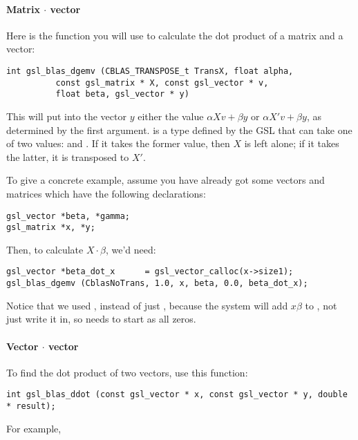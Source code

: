 \paragraph{Matrix $\cdot$ vector} Here is the function you will use to calculate the dot product of a
matrix and a vector:
\begin{lstlisting}
int gsl_blas_dgemv (CBLAS_TRANSPOSE_t TransX, float alpha, 
          const gsl_matrix * X, const gsl_vector * v, 
          float beta, gsl_vector * y)
\end{lstlisting}

This will put into the vector $y$ either the value 
$\alpha X v + \beta y$ or $\alpha X' v + \beta y$, as determined by the
first argument.
 is a type defined by the GSL that can take
one of two values:  and . If
it takes the former value, then $X$ is left alone;
if it takes the latter, it is transposed to $X'$.

To give a concrete example, assume you have already got some vectors and matrices which have the following
declarations:
\begin{lstlisting}
gsl_vector *beta, *gamma;     
gsl_matrix *x, *y;           
\end{lstlisting}

Then, to calculate $X\cdot \beta$, we'd need:

\begin{lstlisting}
gsl_vector *beta_dot_x      = gsl_vector_calloc(x->size1);
gsl_blas_dgemv (CblasNoTrans, 1.0, x, beta, 0.0, beta_dot_x);
\end{lstlisting}

Notice that we used , instead of just , because
the system will add $x\beta$ to , not just write it in,
so  needs to start as all zeros.

\paragraph{Vector $\cdot$ vector}
To find the dot product of two vectors, use this function:
\begin{lstlisting}
int gsl_blas_ddot (const gsl_vector * x, const gsl_vector * y, double * result);
\end{lstlisting}

For example,

